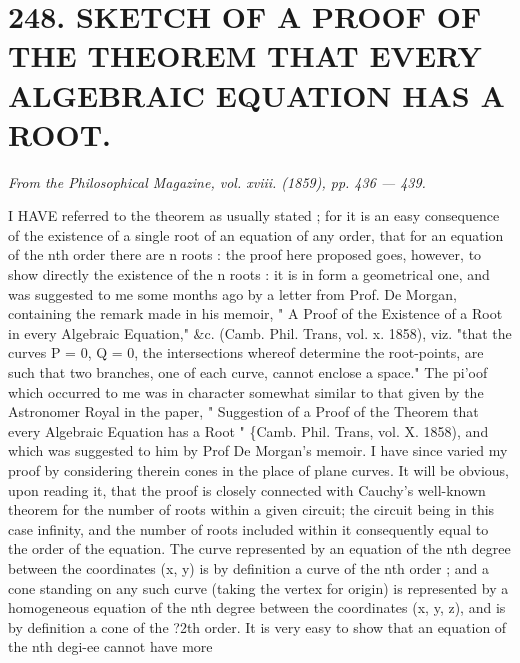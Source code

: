\documentclass[11pt,a4paper]{book}
\begin{document}
\section*{248. SKETCH    OF    A    PROOF    OF    THE    THEOREM    THAT    EVERY ALGEBRAIC    EQUATION    HAS    A    ROOT.}
\begin{flushright}
\textit{From  the  Philosophical  Magazine,  vol.  xviii.  (1859),  pp.  436 — 439.}\n\end{flushright}
\vspace{0.5em}
I  HAVE  referred  to  the  theorem  as  usually  stated ;  for  it  is  an  easy  consequence
of  the  existence  of  a  single  root  of  an  equation  of  any  order,  that  for  an  equation  of
the  nth  order  there  are  n  roots :  the  proof  here  proposed  goes,  however,  to  show
directly  the  existence  of  the  n  roots :  it  is  in  form  a  geometrical  one,  and  was
suggested  to  me  some  months  ago  by  a  letter  from  Prof.  De  Morgan,  containing  the
remark  made  in  his  memoir,  "  A  Proof  of  the  Existence  of  a  Root  in  every  Algebraic
Equation,"  \&c.  (Camb.  Phil.  Trans,  vol.  x.  1858),  viz.  "that  the  curves  P  =  0,  Q  =  0,
the  intersections  whereof  determine  the  root-points,  are  such  that  two  branches,  one
of  each  curve,  cannot  enclose  a  space."  The  pi'oof  which  occurred  to  me  was  in
character  somewhat  similar  to  that  given  by  the  Astronomer  Royal  in  the  paper,
"  Suggestion  of  a  Proof  of  the  Theorem  that  every  Algebraic  Equation  has  a  Root "
\{Camb.  Phil.  Trans,  vol.  X.  1858),  and  which  was  suggested  to  him  by  Prof  De  Morgan's
memoir.  I  have  since  varied  my  proof  by  considering  therein  cones  in  the  place  of
plane  curves.  It  will  be  obvious,  upon  reading  it,  that  the  proof  is  closely  connected
with  Cauchy's  well-known  theorem  for  the  number  of  roots  within  a  given  circuit;
the  circuit  being  in  this  case  infinity,  and  the  number  of  roots  included  within  it
consequently  equal  to  the  order  of  the  equation.
The  curve  represented  by  an  equation  of  the  nth  degree  between  the  coordinates
(x,  y)  is  by  definition  a  curve  of  the  nth  order ;  and  a  cone  standing  on  any  such
curve  (taking  the  vertex  for  origin)  is  represented  by  a  homogeneous  equation  of  the
nth  degree  between  the  coordinates  (x,  y,  z),  and  is  by  definition  a  cone  of  the  ?2th
order.  It  is  very  easy  to  show  that  an  equation  of  the  nth  degi-ee  cannot  have  more
\end{document}
